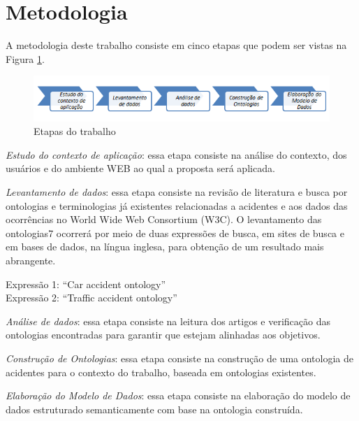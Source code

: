 \section{Metodologia}

A metodologia deste trabalho consiste em cinco etapas que podem ser vistas na
Figura \ref{fig:metodologia}.

\graphicspath{{figuras/}}

\begin{figure}[!htb]
 \centering
 \includegraphics[scale = 0.5]{metodologia}
 \caption{Etapas do trabalho}
 \label{fig:metodologia}

\end{figure}
\textit{Estudo do contexto de aplicação}: essa etapa consiste na análise do contexto, dos
usuários e do ambiente WEB ao qual a proposta será aplicada.

\textit{Levantamento de dados}: essa etapa consiste na revisão de literatura e busca por
ontologias e terminologias já existentes relacionadas a acidentes e aos dados das
ocorrências no World Wide Web Consortium (W3C). O levantamento das ontologias7
ocorrerá por meio de duas expressões de busca, em sites de busca e em bases de dados, na
língua inglesa, para obtenção de um resultado mais abrangente.

\begin{center}
  Expressão 1: “Car accident ontology”\\
  Expressão 2: “Traffic accident ontology”
\end{center}


\textit{Análise de dados}: essa etapa consiste na leitura dos artigos e verificação das
ontologias encontradas para garantir que estejam alinhadas aos objetivos.

\textit{Construção de Ontologias}: essa etapa consiste na construção de uma ontologia de
acidentes para o contexto do trabalho, baseada em ontologias existentes.

\textit{Elaboração do Modelo de Dados}: essa etapa consiste na elaboração do modelo de
dados estruturado semanticamente com base na ontologia construída.